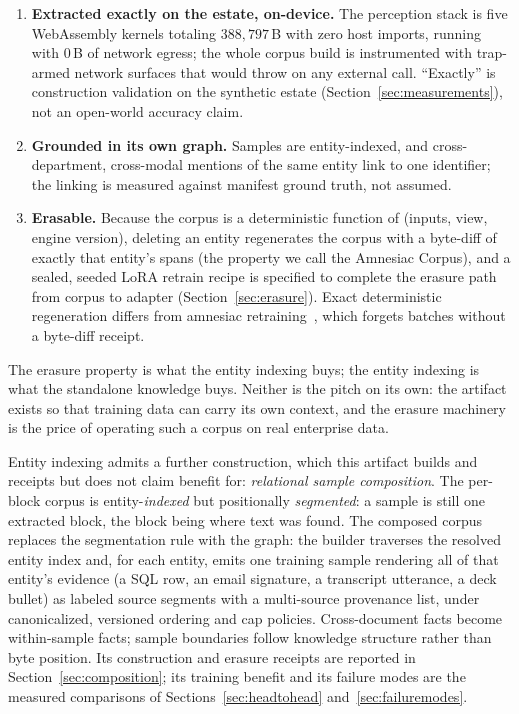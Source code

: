 \documentclass{article}
\begin{document}
\begin{enumerate}
  \item \textbf{Extracted exactly on the estate, on-device.} The perception stack is five WebAssembly kernels totaling $388{,}797$\,B with zero host imports, running with $0$\,B of network egress; the whole corpus build is instrumented with trap-armed network surfaces that would throw on any external call. ``Exactly'' is construction validation on the synthetic estate (Section~\ref{sec:measurements}), not an open-world accuracy claim.
  \item \textbf{Grounded in its own graph.} Samples are entity-indexed, and cross-department, cross-modal mentions of the same entity link to one identifier; the linking is measured against manifest ground truth, not assumed.
  \item \textbf{Erasable.} Because the corpus is a deterministic function of (inputs, view, engine version), deleting an entity regenerates the corpus with a byte-diff of exactly that entity's spans (the property we call the Amnesiac Corpus), and a sealed, seeded LoRA retrain recipe is specified to complete the erasure path from corpus to adapter (Section~\ref{sec:erasure}). Exact deterministic regeneration differs from amnesiac retraining~\cite{graves2021amnesiac}, which forgets batches without a byte-diff receipt.
\end{enumerate}

The erasure property is what the entity indexing buys; the entity indexing is what the standalone knowledge buys. Neither is the pitch on its own: the artifact exists so that training data can carry its own context, and the erasure machinery is the price of operating such a corpus on real enterprise data.

Entity indexing admits a further construction, which this artifact builds and receipts but does not claim benefit for: \emph{relational sample composition}. The per-block corpus is entity-\emph{indexed} but positionally \emph{segmented}: a sample is still one extracted block, the block being where text was found. The composed corpus replaces the segmentation rule with the graph: the builder traverses the resolved entity index and, for each entity, emits one training sample rendering all of that entity's evidence (a SQL row, an email signature, a transcript utterance, a deck bullet) as labeled source segments with a multi-source provenance list, under canonicalized, versioned ordering and cap policies. Cross-document facts become within-sample facts; sample boundaries follow knowledge structure rather than byte position. Its construction and erasure receipts are reported in Section~\ref{sec:composition}; its training benefit and its failure modes are the measured comparisons of Sections~\ref{sec:headtohead} and~\ref{sec:failuremodes}.
\end{document}
